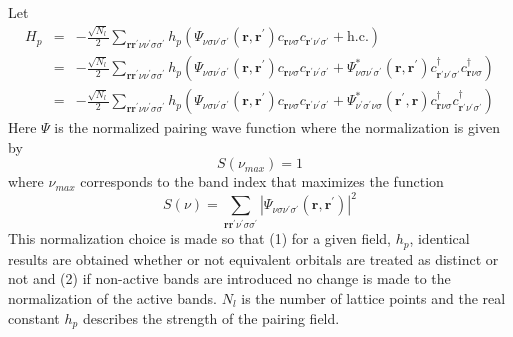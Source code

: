 Let
\begin{eqnarray}
H_{p} & = & - \frac{\sqrt{N_l}}{2} 
\sum_{\mathbf{r}\mathbf{r}^{\prime}\nu\nu^{\prime}\sigma\sigma^{\prime}} 
h_p \left( \Psi_{\nu\sigma\nu^{\prime}\sigma^{\prime}}(\mathbf{r},\mathbf{r}^{\prime})
c_{\mathbf{r}\nu\sigma}
c_{\mathbf{r}^{\prime}\nu^{\prime}\sigma^{\prime}} + \mathrm{h.c.}\right) \\
 &  = & - \frac{\sqrt{N_l}}{2} \sum_{\mathbf{r}\mathbf{r}^{\prime}\nu\nu^{\prime}\sigma\sigma^{\prime}} 
h_p \left(\Psi_{\nu\sigma\nu^{\prime}\sigma^{\prime}}(\mathbf{r},\mathbf{r}^{\prime})  
c_{\mathbf{r}\nu\sigma}
c_{\mathbf{r}^{\prime}\nu^{\prime}\sigma^{\prime}} + 
\Psi_{\nu\sigma\nu^{\prime}\sigma^{\prime}}^*(\mathbf{r},\mathbf{r}^{\prime}) 
c^{\dagger}_{\mathbf{r}^{\prime}\nu^{\prime}\sigma^{\prime}}
 c^{\dagger}_{\mathbf{r}\nu\sigma}\right) \\
& = &  - \frac{\sqrt{N_l}}{2} 
\sum_{\mathbf{r}\mathbf{r}^{\prime}\nu\nu^{\prime}\sigma\sigma^{\prime}} 
h_p \left(\Psi_{\nu\sigma\nu^{\prime}\sigma^{\prime}}(\mathbf{r},\mathbf{r}^{\prime})  
c_{\mathbf{r}\nu\sigma}
c_{\mathbf{r}^{\prime}\nu^{\prime}\sigma^{\prime}} + 
\Psi_{\nu^{\prime}\sigma^{\prime}\nu\sigma}^*(\mathbf{r}^{\prime},\mathbf{r}) 
 c^{\dagger}_{\mathbf{r}\nu\sigma}c^{\dagger}_{\mathbf{r}^{\prime}\nu^{\prime}\sigma^{\prime}}
  \right)
\end{eqnarray}
Here $\Psi$ is the normalized pairing wave function
where the normalization is given by
\begin{equation}
S(\nu_{max})  =  1 
\end{equation}
where $\nu_{max}$ corresponds to the band index 
that maximizes the function
\begin{equation}
S(\nu) = \sum_{\mathbf{r}\mathbf{r}^{\prime}\nu^{\prime}\sigma\sigma^{\prime}} | 
\Psi_{\nu\sigma\nu^{\prime}\sigma^{\prime}}(\mathbf{r},\mathbf{r}^{\prime}) |^2 
\end{equation}
This normalization choice is made so that (1) for a given field, $h_p$, 
identical results are obtained whether or not equivalent orbitals are
treated as distinct or not and (2) if non-active bands are introduced no
change is made to the normalization of the active bands.
$N_l$ is the number of lattice points
and the real constant $h_p$ describes the strength of the
pairing field.

